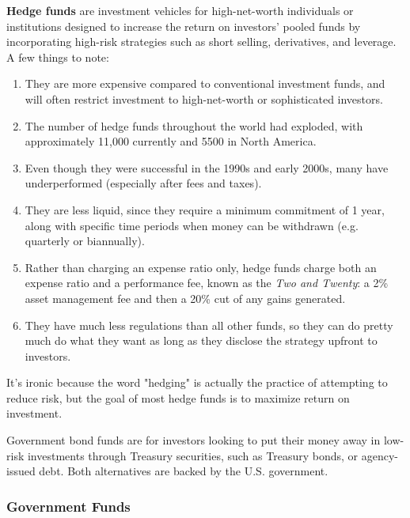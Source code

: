 \documentclass{article}
\begin{document}
      \begin{definition}
        \textbf{Hedge funds} are investment vehicles for high-net-worth individuals or institutions designed to increase the return on investors' pooled funds by incorporating high-risk strategies such as short selling, derivatives, and leverage. A few things to note: 
        \begin{enumerate}
          \item They are more expensive compared to conventional investment funds, and will often restrict investment to high-net-worth or sophisticated investors. 
          \item The number of hedge funds throughout the world had exploded, with approximately 11,000 currently and 5500 in North America. 
          \item Even though they were successful in the 1990s and early 2000s, many have underperformed (especially after fees and taxes). 
          \item They are less liquid, since they require a minimum commitment of 1 year, along with specific time periods when money can be withdrawn (e.g. quarterly or biannually). 
          \item Rather than charging an expense ratio only, hedge funds charge both an expense ratio and a performance fee, known as the \textit{Two and Twenty}: a 2\% asset management fee and then a 20\% cut of any gains generated. 
          \item They have much less regulations than all other funds, so they can do pretty much do what they want as long as they disclose the strategy upfront to investors. 
        \end{enumerate}
        It's ironic because the word "hedging" is actually the practice of attempting to reduce risk, but the goal of most hedge funds is to maximize return on investment. 
      \end{definition}

      \begin{definition}
        Government bond funds are for investors looking to put their money away in low-risk investments through Treasury securities, such as Treasury bonds, or agency-issued debt. Both alternatives are backed by the U.S. government. 
      \end{definition}

    \subsubsection{Government Funds}
\end{document}
